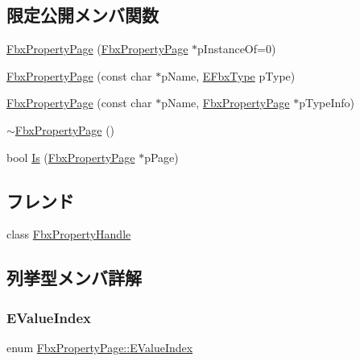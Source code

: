 \subsection*{限定公開メンバ関数}
\begin{DoxyCompactItemize}
\item 
\hyperlink{class_fbx_property_page_a68b9f893133e151f86c3c29a8fccf66d}{Fbx\+Property\+Page} (\hyperlink{class_fbx_property_page}{Fbx\+Property\+Page} $\ast$p\+Instance\+Of=0)
\item 
\hyperlink{class_fbx_property_page_ac6cee403bff8503088a7b425cc8cf02b}{Fbx\+Property\+Page} (const char $\ast$p\+Name, \hyperlink{fbxpropertytypes_8h_a73913a5ddfb20e57c6f25e9e6784bd92}{E\+Fbx\+Type} p\+Type)
\item 
\hyperlink{class_fbx_property_page_a8eea21b02443bbf63e2aa75f2ab1c753}{Fbx\+Property\+Page} (const char $\ast$p\+Name, \hyperlink{class_fbx_property_page}{Fbx\+Property\+Page} $\ast$p\+Type\+Info)
\item 
\hyperlink{class_fbx_property_page_a948765127c1ab18f2236023cc2255cf5}{$\sim$\+Fbx\+Property\+Page} ()
\item 
bool \hyperlink{class_fbx_property_page_a8bc4d86023cb4e9d067e2d99c9911e7f}{Is} (\hyperlink{class_fbx_property_page}{Fbx\+Property\+Page} $\ast$p\+Page)
\end{DoxyCompactItemize}
\subsection*{フレンド}
\begin{DoxyCompactItemize}
\item 
class \hyperlink{class_fbx_property_page_a22125c271a14844d33fa71927b100f2d}{Fbx\+Property\+Handle}
\end{DoxyCompactItemize}


\subsection{列挙型メンバ詳解}
\mbox{\label{class_fbx_property_page_a056448778e0c4902bf32c07188d79097}} 
\subsubsection{\texorpdfstring{E\+Value\+Index}{EValueIndex}}
{\footnotesize\ttfamily enum \hyperlink{class_fbx_property_page_a056448778e0c4902bf32c07188d79097}{Fbx\+Property\+Page\+::\+E\+Value\+Index}}

